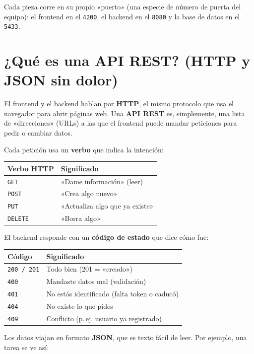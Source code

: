 \documentclass[11pt,a4paper]{article}
\begin{document}
Cada pieza corre en su propio «puerto» (una especie de número de puerta del
equipo): el frontend en el \texttt{4200}, el backend en el \texttt{8080} y la
base de datos en el \texttt{5433}.

\section{¿Qué es una API REST? (HTTP y JSON sin dolor)}

El frontend y el backend hablan por \textbf{HTTP}, el mismo protocolo que usa el
navegador para abrir páginas web. Una \textbf{API REST} es, simplemente, una
lista de «direcciones» (URLs) a las que el frontend puede mandar peticiones para
pedir o cambiar datos.

Cada petición usa un \textbf{verbo} que indica la intención:

\begin{center}
\begin{tabular}{ll}
\textbf{Verbo HTTP} & \textbf{Significado} \\\hline
\texttt{GET}    & «Dame información» (leer) \\
\texttt{POST}   & «Crea algo nuevo» \\
\texttt{PUT}    & «Actualiza algo que ya existe» \\
\texttt{DELETE} & «Borra algo» \\
\end{tabular}
\end{center}

El backend responde con un \textbf{código de estado} que dice cómo fue:

\begin{center}
\begin{tabular}{ll}
\textbf{Código} & \textbf{Significado} \\\hline
\texttt{200 / 201} & Todo bien (201 = «creado») \\
\texttt{400} & Mandaste datos mal (validación) \\
\texttt{401} & No estás identificado (falta token o caducó) \\
\texttt{404} & No existe lo que pides \\
\texttt{409} & Conflicto (p.\,ej. usuario ya registrado) \\
\end{tabular}
\end{center}

Los datos viajan en formato \textbf{JSON}, que es texto fácil de leer. Por
ejemplo, una tarea se ve así:
\end{document}
